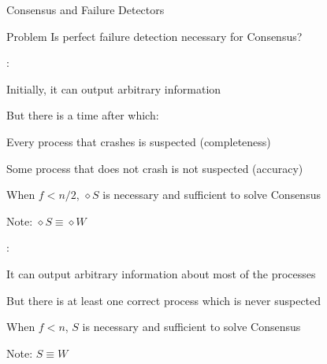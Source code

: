 \begin{frame}{Consensus and Failure Detectors}
	
\begin{block}{Problem}
Is perfect failure detection necessary for Consensus? 
\end{block}

\begin{overprint}

\bigskip
{}:

\BIL
\item Initially, it can output arbitrary information
\item But there is a time after which:
\BI
  \item \alert{Every} process that crashes is suspected (completeness)
  \item \alert{Some} process that does not crash is not suspected (accuracy)
\EI
\item When $f < n/2$, $\diamond S$ is necessary and sufficient to solve Consensus
\item Note: $\diamond S \equiv \diamond W$
\EIL	

\bigskip
{}:

\BIL
\item It can output arbitrary information about most of the processes
\item But there is at least one correct process which is never suspected
\item When $f < n$, $S$ is necessary and sufficient to solve Consensus
\item Note: $S \equiv W$
\EIL	

\end{overprint}

\end{frame}

